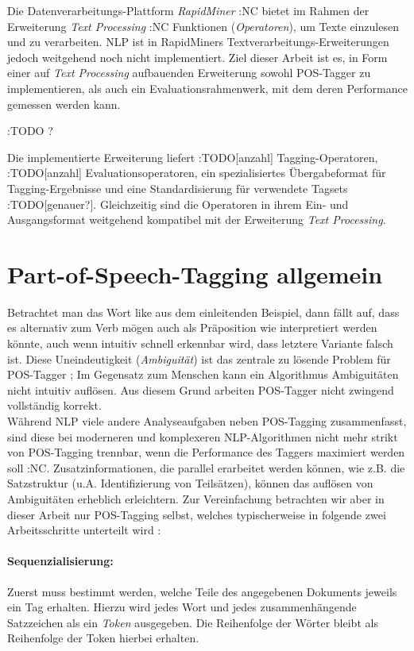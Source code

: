 Die Datenverarbeitungs-Plattform \textit{RapidMiner} :NC bietet im Rahmen der Erweiterung \textit{Text Processing} :NC Funktionen (\textit{Operatoren}), um Texte einzulesen und zu verarbeiten. NLP ist in RapidMiners Textverarbeitungs-Erweiterungen jedoch weitgehend noch nicht implementiert. Ziel dieser Arbeit ist es, in Form einer auf \textit{Text Processing} aufbauenden Erweiterung sowohl POS-Tagger zu implementieren, als auch ein Evaluationsrahmenwerk, mit dem deren Performance gemessen werden kann.

:TODO ?

Die implementierte Erweiterung liefert :TODO[anzahl] Tagging-Operatoren, :TODO[anzahl] Evaluationsoperatoren, ein spezialisiertes Übergabeformat für Tagging-Ergebnisse und eine Standardisierung für verwendete Tagsets :TODO[genauer?]. Gleichzeitig sind die Operatoren in ihrem Ein- und Ausgangsformat weitgehend kompatibel mit der Erweiterung \textit{Text Processing}.

\section{Part-of-Speech-Tagging allgemein}
\label{sec:intro:pos}

Betrachtet man das Wort \glqq like\grqq{} aus dem einleitenden Beispiel, dann fällt auf, dass es alternativ zum Verb \glqq mögen\grqq{} auch als Präposition \glqq wie\grqq{} interpretiert werden könnte, auch wenn intuitiv schnell erkennbar wird, dass letztere Variante falsch ist. Diese Uneindeutigkeit (\textit{Ambiguität}) ist das zentrale zu lösende Problem für POS-Tagger  \cite{Smith}; Im Gegensatz zum Menschen kann ein Algorithmus Ambiguitäten nicht intuitiv auflösen. Aus diesem Grund arbeiten POS-Tagger nicht zwingend vollständig korrekt.
\\
Während NLP viele andere Analyseaufgaben neben POS-Tagging zusammenfasst, sind diese bei moderneren und komplexeren NLP-Algorithmen nicht mehr strikt von POS-Tagging trennbar, wenn die Performance des Taggers maximiert werden soll :NC. Zusatzinformationen, die parallel erarbeitet werden können, wie z.B. die Satzstruktur (u.A. Identifizierung von Teilsätzen), können das auflösen von Ambiguitäten erheblich erleichtern. Zur Vereinfachung betrachten wir aber in dieser Arbeit nur POS-Tagging selbst, welches typischerweise in folgende zwei Arbeitsschritte unterteilt wird \cite{Smith}:

\paragraph{Sequenzialisierung:} Zuerst muss bestimmt werden, welche Teile des angegebenen Dokuments jeweils ein Tag erhalten. Hierzu wird jedes Wort und jedes zusammenhängende Satzzeichen als ein \textit{Token} ausgegeben. Die Reihenfolge der Wörter bleibt als Reihenfolge der Token hierbei erhalten. 
